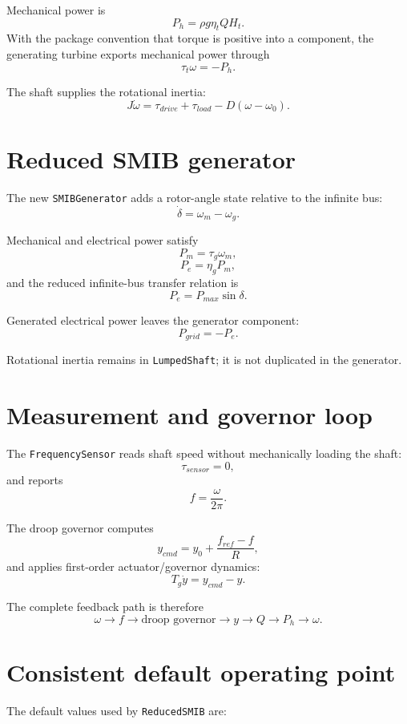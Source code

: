 \documentclass[11pt,a4paper]{article}
\begin{document}
Mechanical power is
\[
P_h=\rho g\eta_t QH_t.
\]
With the package convention that torque is positive into a component, the generating turbine exports mechanical power through
\[
\tau_t\omega=-P_h.
\]

The shaft supplies the rotational inertia:
\[
J\dot\omega =
\tau_{drive}
+
\tau_{load}
-
D(\omega-\omega_0).
\]

\section{Reduced SMIB generator}
The new \texttt{SMIBGenerator} adds a rotor-angle state relative to the infinite bus:
\[
\dot\delta=\omega_m-\omega_g.
\]

Mechanical and electrical power satisfy
\[
P_m=\tau_g\omega_m,
\]
\[
P_e=\eta_gP_m,
\]
and the reduced infinite-bus transfer relation is
\[
P_e=P_{max}\sin\delta.
\]

Generated electrical power leaves the generator component:
\[
P_{grid}=-P_e.
\]

Rotational inertia remains in \texttt{LumpedShaft}; it is not duplicated in the generator.

\section{Measurement and governor loop}
The \texttt{FrequencySensor} reads shaft speed without mechanically loading the shaft:
\[
\tau_{sensor}=0,
\]
and reports
\[
f=\frac{\omega}{2\pi}.
\]

The droop governor computes
\[
y_{cmd}
=
y_0+\frac{f_{ref}-f}{R},
\]
and applies first-order actuator/governor dynamics:
\[
T_g\dot y=y_{cmd}-y.
\]

The complete feedback path is therefore
\[
\omega
\rightarrow
f
\rightarrow
\text{droop governor}
\rightarrow
y
\rightarrow
Q
\rightarrow
P_h
\rightarrow
\omega.
\]

\section{Consistent default operating point}
The default values used by \texttt{ReducedSMIB} are:
\end{document}
